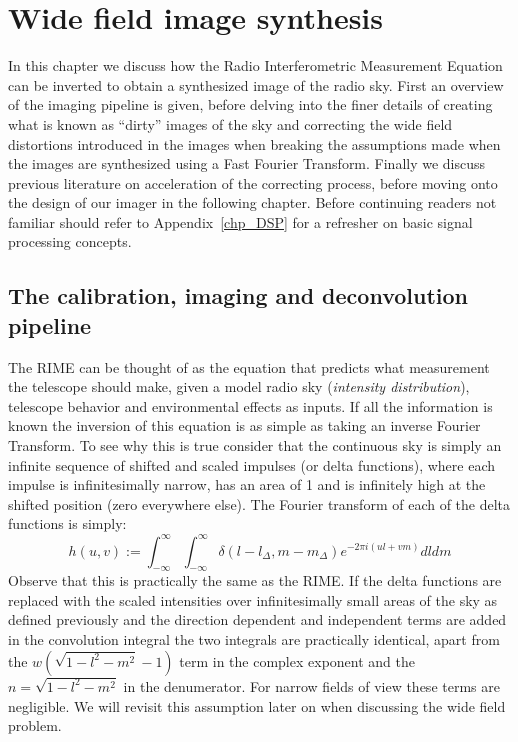 \chapter{Wide field image synthesis}
In this chapter we discuss how the Radio Interferometric Measurement Equation can be inverted to obtain a synthesized image of the radio sky. First an overview of the imaging pipeline is given, before
delving into the finer details of creating what is known as ``dirty'' images of the sky and correcting the wide field distortions introduced in the images when breaking the assumptions made when the images 
are synthesized using a Fast Fourier Transform. Finally we discuss previous literature on acceleration of the correcting process, before moving onto the design of our imager in the following chapter. Before
continuing readers not familiar should refer to Appendix~\ref{chp_DSP} for a refresher on basic signal processing concepts.
\section{The calibration, imaging and deconvolution pipeline}
The RIME can be thought of as the equation that predicts what measurement the telescope should make, given a model radio sky (\emph{intensity distribution}), telescope behavior and environmental effects as inputs. 
If all the information is known the inversion of this equation is as simple as taking an inverse Fourier Transform. To see why this is true consider that the continuous sky is simply an infinite sequence of 
shifted and scaled impulses (or delta functions), where each impulse is infinitesimally narrow, has an area of 1 and is infinitely high at the shifted position (zero everywhere else). The Fourier transform 
of each of the delta functions is simply:
\begin{equation*}
 h(u,v) := \int_{-\infty}^\infty\int_{-\infty}^\infty \delta(l-l_\Delta,m-m_\Delta)e^{-2\pi i(ul+vm)}dldm
\end{equation*}
Observe that this is practically the same as the RIME. If the delta functions are replaced with the scaled intensities over infinitesimally small areas of the sky as defined previously and the direction dependent and
independent terms are added in the convolution integral the two integrals are practically identical, apart from the $w(\sqrt{1-l^2-m^2}-1)$ term in the complex exponent and the $n = \sqrt{1-l^2-m^2}$ in the denumerator. 
For narrow fields of view these terms are negligible. We will revisit this assumption later on when discussing the wide field problem.

